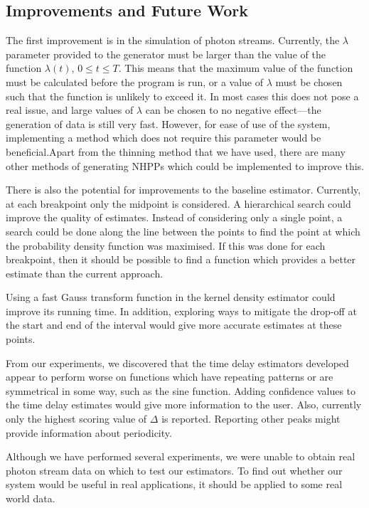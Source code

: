 \documentclass[a4paper,11pt]{article}
\begin{document}
\subsection{Improvements and Future Work}
\label{sec-9-1}

   The first improvement is in the simulation of photon streams. Currently, the
   $\lambda$ parameter provided to the generator must be larger than the value
   of the function $\lambda(t),\,0\leq t\leq T$. This means that the maximum
   value of the function must be calculated before the program is run, or a
   value of $\lambda$ must be chosen such that the function is unlikely to
   exceed it. In most cases this does not pose a real issue, and large values of
   $\lambda$ can be chosen to no negative effect---the generation of data is
   still very fast. However, for ease of use of the system, implementing a
   method which does not require this parameter would be beneficial.Apart from
   the thinning method that we have used, there are many other methods of
   generating NHPPs \cite{pasupathy2011,lewis1976simulation} which could be
   implemented to improve this.

   There is also the potential for improvements to the baseline
   estimator. Currently, at each breakpoint only the midpoint is considered. A
   hierarchical search could improve the quality of estimates. Instead of
   considering only a single point, a search could be done along the line
   between the points to find the point at which the probability density
   function was maximised. If this was done for each breakpoint, then it should
   be possible to find a function which provides a better estimate than the
   current approach.

   Using a fast Gauss transform function in the kernel density estimator could
   improve its running time. In addition, exploring ways to mitigate the
   drop-off at the start and end of the interval would give more accurate
   estimates at these points.

   From our experiments, we discovered that the time delay estimators developed
   appear to perform worse on functions which have repeating patterns or are
   symmetrical in some way, such as the sine function. Adding confidence values
   to the time delay estimates would give more information to the user. Also,
   currently only the highest scoring value of $\Delta$ is reported. Reporting
   other peaks might provide information about periodicity.

   Although we have performed several experiments, we were unable to obtain real
   photon stream data on which to test our estimators. To find out whether our
   system would be useful in real applications, it should be applied to some
   real world data.
\end{document}
